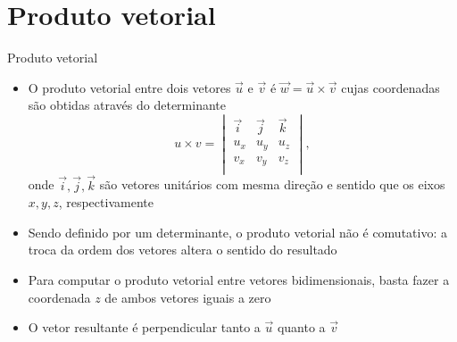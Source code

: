 \section{Produto vetorial}

\begin{frame}[fragile]{Produto vetorial}

    \begin{itemize}
        \item O produto vetorial entre dois vetores $\vec{u}$ e $\vec{v}$ é $\vec{w} = \vec{u}
        \times \vec{v}$ cujas coordenadas são obtidas através do determinante 
        \[
            u\times v = \begin{vmatrix}
                \vec{i} & \vec{j} & \vec{k} \\
                u_x & u_y & u_z \\
                v_x & v_y & v_z \\
            \end{vmatrix},
        \]
        onde $\vec{i}, \vec{j}, \vec{k}$ são vetores unitários com mesma direção e sentido que os 
        eixos $x, y, z$, respectivamente
        \pause

        \item Sendo definido por um determinante, o produto vetorial não é comutativo: a troca da 
            ordem dos vetores altera o sentido do resultado
        \pause

        \item Para computar o produto vetorial entre vetores bidimensionais, basta fazer a 
            coordenada $z$ de ambos vetores iguais a zero
        \pause

        \item O vetor resultante é perpendicular tanto a $\vec{u}$ quanto a $\vec{v}$ 

    \end{itemize}

\end{frame}

